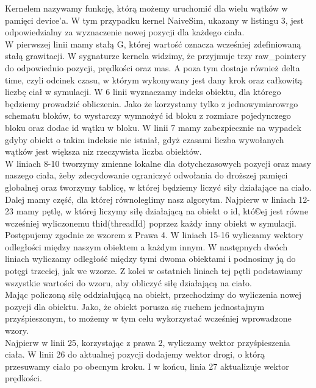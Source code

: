 \documentclass[14pt,twoside,a4paper]{article}
\begin{document}
\bigskip
\bigskip
Kernelem nazywamy funkcję, którą możemy uruchomić dla wielu wątków w pamięci device'a. W tym przypadku kernel NaiveSim, ukazany w listingu 3, jest odpowiedzialny za wyznaczenie nowej pozycji dla każdego ciała. \\
\bigskip
W pierwszej linii mamy stałą G, której wartość oznacza wcześniej zdefiniowaną stałą grawitacji.
W sygnaturze kernela widzimy, że przyjmuje trzy raw\_pointery do odpowiednio pozycji, prędkości oraz mas. A poza tym dostaje również delta time, czyli odcinek czasu, w którym wykonywany jest dany krok oraz całkowitą liczbę ciał w symulacji. W 6 linii wyznaczamy indeks obiektu, dla którego będziemy prowadzić obliczenia. Jako że korzystamy tylko z jednowymiarowrgo schematu bloków, to wystarczy wymnożyć id bloku z rozmiare pojedynczego bloku oraz dodac id wątku w bloku. 
W linii 7 mamy zabezpiecznie na wypadek gdyby obiekt o takim indeksie nie istniał, gdyż czasami liczba wywołanych wątków jest większa niz rzeczywista liczba obiektów. \\
\bigskip
W liniach 8-10 tworzymy zmienne lokalne dla dotychczasowych pozycji oraz masy naszego ciała, żeby zdecydowanie ograniczyć odwołania do droższej pamięci globalnej oraz tworzymy tablicę, w której będziemy liczyć siły działające na ciało.\\
\bigskip
Dalej mamy część, dla której równoleglimy nasz algorytm. Najpierw w liniach 12-23 mamy pętlę, w której liczymy siłę działającą na obiekt o id, któ©ej jest równe wcześniej wyliczonemu thid(threadId) poprzez każdy inny obiekt w symulacji. Postępujemy zgodnie ze wzorem z Prawa 4. W liniach 15-16 wyliczamy wektory odległości między naszym obiektem a każdym innym. W następnych dwóch liniach wyliczamy odległość między tymi dwoma obiektami i podnosimy ją do potęgi trzeciej, jak we wzorze. Z kolei w ostatnich liniach tej pętli podstawiamy wszystkie wartości do wzoru, aby obliczyć siłę działającą na ciało. \\
\bigskip
Mając policzoną siłę oddziałującą na obiekt, przechodzimy do wyliczenia nowej pozycji dla obiektu. Jako, że obiekt porusza się ruchem jednostajnym przyśpieszonym, to możemy w tym celu wykorzystać wcześniej wprowadzone wzory.\\ Najpierw w linii 25, korzystając z prawa 2, wyliczamy wektor przyśpieszenia ciała. W linii 26 do aktualnej pozycji dodajemy wektor drogi, o którą przesuwamy ciało po obecnym kroku. I w końcu, linia 27 aktualizuje wektor prędkości.
\bigskip
\bigskip
\end{document}
